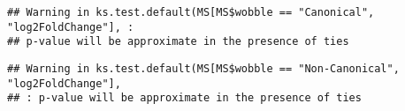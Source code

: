 \documentclass[
]{article}
\newenvironment{Shaded}{\begin{snugshade}}{\end{snugshade}}
\newcommand{\FunctionTok}[1]{\textcolor[rgb]{0.13,0.29,0.53}{\textbf{#1}}}
\newcommand{\NormalTok}[1]{#1}
\newcommand{\OtherTok}[1]{\textcolor[rgb]{0.56,0.35,0.01}{#1}}
\newcommand{\SpecialCharTok}[1]{\textcolor[rgb]{0.81,0.36,0.00}{\textbf{#1}}}
\newcommand{\StringTok}[1]{\textcolor[rgb]{0.31,0.60,0.02}{#1}}
\begin{document}
\begin{verbatim}
## Warning in ks.test.default(MS[MS$wobble == "Canonical", "log2FoldChange"], :
## p-value will be approximate in the presence of ties
\end{verbatim}

\begin{Shaded}
\end{Shaded}

\begin{verbatim}
## Warning in ks.test.default(MS[MS$wobble == "Non-Canonical", "log2FoldChange"],
## : p-value will be approximate in the presence of ties
\end{verbatim}
\end{document}
